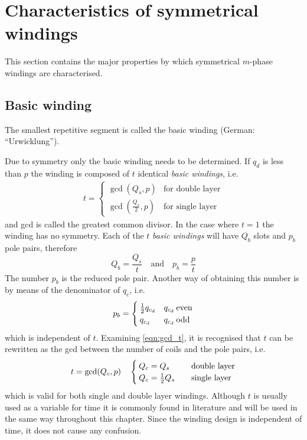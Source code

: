\section{Characteristics of symmetrical windings}
This section contains the major properties by which symmetrical $m$-phase windings are characterised.

\subsection{Basic winding}
\begin{defth}
The smallest repetitive segment is called the basic winding (German: ``Urwicklung'').
\end{defth} 
Due to symmetry only the basic winding needs to be determined. If $q_d$ is less than $p$ the winding is composed of $t$ identical \textit{basic windings}, i.e.
\begin{equation}
  \label{eqn:gcd_t}
  \begin{array}{ll}
  t = \begin{cases}
        \gcd\left(Q_s,p\right)  & \text{for double layer}\\
        \gcd\left(\frac{Q_s}{2},p\right) & \text{for single layer}
      \end{cases}
  \end{array}
\end{equation}
and gcd is called the greatest common divisor. In the case where $t=1$ the winding has no symmetry. Each of the $t$ \textit{basic windings} will have $Q_b$ slots and $p_b$ pole pairs, therefore
\begin{equation}
  \label{eqn:qd_pb}
  Q_b = \frac{Q_s}{t} \quad \mbox{and} \quad p_b = \frac{p}{t} 
\end{equation}
The number $p_b$ is the reduced pole pair. Another way of obtaining this number is by means of the denominator of $q_c$, i.e.
\begin{equation}
  \label{eqn:p_b}
  p_b =  
  \begin{cases}
    \frac{1}{2} q_{c_d}  & q_{c_d} \: \textnormal{even} \\
    q_{c_d}  & q_{c_d} \: \textnormal{odd}
  \end{cases}
\end{equation} 
which is independent of $t$. Examining \eqref{eqn:gcd_t}, it is recognised that $t$ can be rewritten as the gcd between the number of coils and the pole pairs, i.e.
\begin{equation}
  \label{eqn:gcd_t_gcd(Qc_p)}
  t = \gcd(Q_c,p) \quad
  \begin{cases}
    Q_c = Q_s \quad & \textnormal{double layer} \\
    Q_c = \frac{1}{2}Q_s \quad & \textnormal{single layer}
  \end{cases}
\end{equation} 
which is valid for both single and double layer windings. Although $t$ is usually used as a variable for time it is commonly found in literature and will be used in the same way throughout this chapter. Since the winding design is independent of time, it does not cause any confusion.

